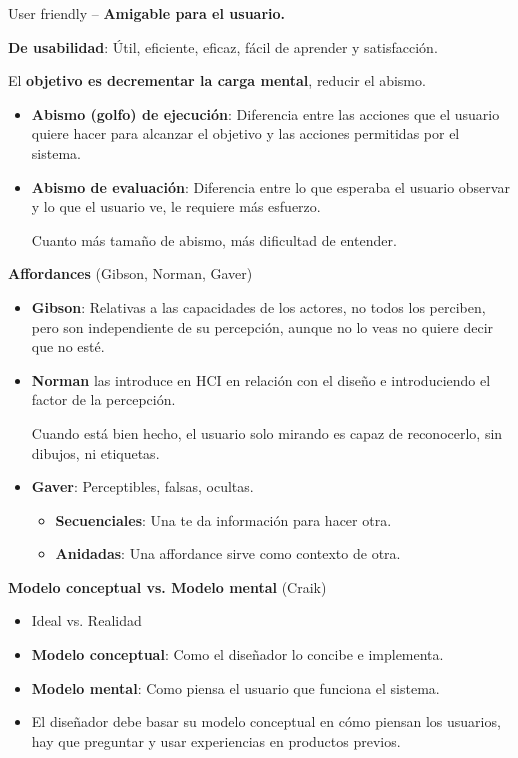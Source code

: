 \documentclass[12pt, twoside, openright]{report} %
\begin{document}
User friendly -- \textbf{Amigable para el usuario.}

\textbf{De usabilidad}: Útil, eficiente, eficaz, fácil de aprender y
satisfacción.

El \textbf{objetivo es decrementar la carga mental}, reducir el abismo.

\begin{itemize}
	\item \textbf{Abismo (golfo) de ejecución}: Diferencia entre las acciones
	      que el usuario quiere hacer para alcanzar el objetivo y las acciones
	      permitidas por el sistema.
	\item \textbf{Abismo de evaluación}: Diferencia entre lo que esperaba el
	      usuario observar y lo que el usuario ve, le requiere más esfuerzo.

	      Cuanto más tamaño de abismo, más dificultad de entender.
\end{itemize}

\textbf{Affordances} (Gibson, Norman, Gaver)

\begin{itemize}
	\item \textbf{Gibson}: Relativas a las capacidades de los actores, no todos
	      los perciben, pero son independiente de su percepción, aunque no lo
	      veas no quiere decir que no esté.
	\item \textbf{Norman} las introduce en HCI en relación con el diseño e
	      introduciendo el factor de la percepción.

	      Cuando está bien hecho, el usuario solo mirando es capaz de
	      reconocerlo, sin dibujos, ni etiquetas.
	\item \textbf{Gaver}: Perceptibles, falsas, ocultas.

	      \begin{itemize}
		      \item \textbf{Secuenciales}: Una te da información para hacer otra.
		      \item \textbf{Anidadas}: Una affordance sirve como contexto de otra.
	      \end{itemize}
\end{itemize}

\textbf{Modelo conceptual vs. Modelo mental} (Craik)

\begin{itemize}
	\item Ideal vs. Realidad
	\item \textbf{Modelo conceptual}: Como el diseñador lo concibe e implementa.
	\item \textbf{Modelo mental}: Como piensa el usuario que funciona el
	      sistema.
	\item El diseñador debe basar su modelo conceptual en cómo piensan los
	      usuarios, hay que preguntar y usar experiencias en productos previos.
\end{itemize}
\end{document}
